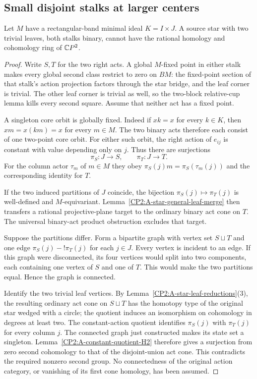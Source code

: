 \subsection{Small disjoint stalks at larger centers}

\begin{lemma}
\label{CP2:A-star-two-binary-band-cores}
Let $M$ have a rectangular-band minimal ideal $K=I\times J$.
A source star with two trivial leaves, both stalks binary,
cannot have the rational homology and cohomology ring of $\mathbb{C}P^2$.
\end{lemma}
\begin{proof}
Write $S,T$ for the two right acts. A global $M$-fixed point
in either stalk makes every global second class restrict to
zero on $BM$: the fixed-point section of that stalk's action
projection factors through the star bridge, and the leaf
corner is trivial. The other leaf corner is trivial as well,
so the two-block relative-cup lemma kills every second square.
Assume that neither act has a fixed point.

A singleton core orbit is globally fixed. Indeed if $xk=x$
for every $k\in K$, then $xm=x(km)=x$ for every $m\in M$.
The two binary acts therefore each consist of one two-point
core orbit. For either such orbit, the right action of
$e_{ij}$ is constant with value depending only on $j$.
Thus there are surjections
\[
 \pi_S:J\to S,\qquad \pi_T:J\to T.
\]
For the column actor $\tau_m$ of $m\in M$ they obey
$\pi_S(j)m=\pi_S(\tau_m(j))$ and the corresponding identity
for $T$.

If the two induced partitions of $J$ coincide, the bijection
$\pi_S(j)\mapsto\pi_T(j)$ is well-defined and $M$-equivariant.
Lemma~\ref{CP2:A-star-general-leaf-merge} then transfers a
rational projective-plane target to the ordinary binary act
cone on $T$. The universal binary-act product obstruction
excludes that target.

Suppose the partitions differ. Form a bipartite graph with
vertex set $S\sqcup T$ and one edge
$\pi_S(j)\!-!\pi_T(j)$ for each $j\in J$. Every vertex is
incident to an edge. If this graph were disconnected, its
four vertices would split into two components, each containing
one vertex of $S$ and one of $T$. This would make the two
partitions equal. Hence the graph is connected.

Identify the two trivial leaf vertices. By
Lemma~\ref{CP2:A-star-leaf-reductions}(3), the resulting ordinary
act cone on $S\sqcup T$ has the homotopy type of the original
star wedged with a circle; the quotient induces an isomorphism
on cohomology in degrees at least two. The constant-action
quotient identifies $\pi_S(j)$ with $\pi_T(j)$ for every
column $j$. The connected graph just constructed makes its
state set a singleton. Lemma~\ref{CP2:A-constant-quotient-H2}
therefore gives a surjection from zero second cohomology to
that of the disjoint-union act cone. This contradicts the
required nonzero second group. No connectedness of the original
action category, or vanishing of its first cone homology,
has been assumed.
\end{proof}

